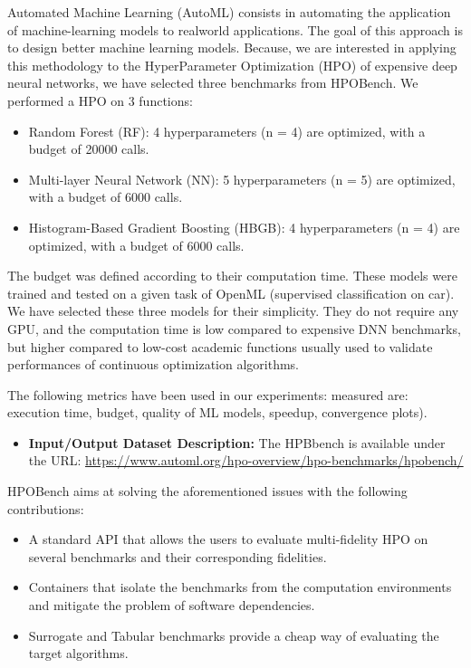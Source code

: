 \begin{itemize}
Automated Machine Learning (AutoML) consists in automating the application of machine-learning models to realworld applications. The goal of this approach is to design better machine learning models. Because, we are interested in applying this methodology to the HyperParameter Optimization
(HPO) of expensive deep neural networks, we have selected three benchmarks from HPOBench. We
performed a HPO on 3 functions:
\begin{itemize}
\item Random Forest (RF): 4 hyperparameters (n = 4) are optimized, with a budget of 20000 calls.
\item Multi-layer Neural Network (NN): 5 hyperparameters (n = 5) are optimized, with a budget of 6000 calls.
\item Histogram-Based Gradient Boosting (HBGB): 4 hyperparameters (n = 4) are optimized, with a budget of 6000 calls.
\end{itemize}

The budget was defined according to their computation time. These models were trained and tested on a given task of OpenML (supervised classification on car). We have selected these three models for their simplicity. They do not require any GPU, and the computation time is low compared to expensive DNN benchmarks, but higher compared to low-cost academic functions usually used to
validate performances of continuous optimization algorithms.

The following metrics have been used in our experiments:  measured are: execution time, budget, quality of ML models, speedup, convergence plots).

\begin{itemize}
\item \textbf{Input/Output Dataset Description:} The HPBbench is available under the URL: \url{https://www.automl.org/hpo-overview/hpo-benchmarks/hpobench/}
\end{itemize}

HPOBench aims at solving the aforementioned issues with the following contributions:

\begin{itemize}
\item A standard API that allows the users to evaluate multi-fidelity HPO on several benchmarks and their corresponding fidelities.
\item Containers that isolate the benchmarks from the computation environments and mitigate the problem of software dependencies.
\item Surrogate and Tabular benchmarks provide a cheap way of evaluating the target algorithms.
\end{itemize}


\end{itemize}
